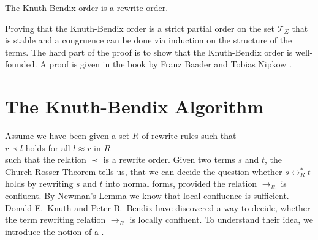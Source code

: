 \begin{Theorem}
  The Knuth-Bendix order is a rewrite order.
\end{Theorem}

Proving that the Knuth-Bendix order is a strict partial order on the set $\mathcal{T}_\Sigma$ that is stable
and a congruence can be done via induction on the structure of the terms.  The hard part of the proof is to
show that the Knuth-Bendix order is well-founded.  A proof is given in the book by Franz Baader and Tobias
Nipkow \cite{baader:1998}.

\section{The Knuth-Bendix Algorithm}
Assume we have been given a set $R$ of rewrite rules such that
\\[0.2cm]
\hspace*{1.3cm}
$r \prec l$ \quad holds for all $l \approx r$ in $R$
\\[0.2cm]
such that the relation $\prec$ is a rewrite order.
Given two terms $s$ and $t$, the Church-Rosser Theorem tells us, that we can decide the question whether
$s \leftrightarrow_R^* t$ holds by rewriting $s$ and $t$ into normal forms, provided the relation
$\rightarrow_R$ is confluent.  By Newman's Lemma we know that local confluence is sufficient.  Donald E.~Knuth
and Peter B.~Bendix \cite{knuth:1970} have discovered a way to decide, whether the term rewriting relation
$\rightarrow_R$ is locally confluent.  To understand their idea, we introduce the notion of a .

